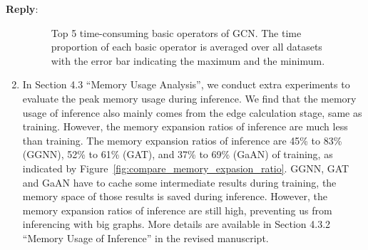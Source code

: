 \documentclass[12pt]{article}
\newenvironment{reply}
   {\medskip \noindent \textbf{Reply}:\  }
   {\medskip}
\begin{document}
\begin{reply}
\begin{enumerate}
    \begin{figure}[h]
        \centering
        \caption{Top 5 time-consuming basic operators of GCN. The time proportion of each basic operator is averaged over all datasets with the error bar indicating the maximum and the minimum.}
        \label{fig:compare_top_basic_operators}
    \end{figure}
    
    \item In Section 4.3 ``Memory Usage Analysis'', we conduct extra experiments to evaluate the peak memory usage during inference.
    We find that the memory usage of inference also mainly comes from the edge calculation stage, same as training.
    However, the memory expansion ratios of inference are much less than training.
    The memory expansion ratios of inference are 45\% to 83\% (GGNN), 52\% to 61\% (GAT), and 37\% to 69\% (GaAN) of training, as indicated by Figure~\ref{fig:compare_memory_expasion_ratio}.
    GGNN, GAT and GaAN have to cache some intermediate results during training, the memory space of those results is saved during inference.
    However, the memory expansion ratios of inference are still high, preventing us from inferencing with big graphs.
    More details are available in Section 4.3.2 ``Memory Usage of Inference'' in the revised manuscript.
    

\end{enumerate}
\end{reply}
\end{document}
